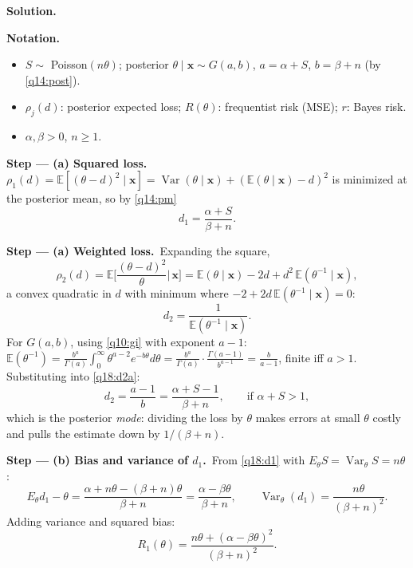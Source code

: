 \documentclass[11pt,a4paper]{article}
\numberwithin{equation}{questao}   %
\newenvironment{notacao}{\par\smallskip\noindent\textbf{Notation.}\begin{itemize}[leftmargin=1.4em,topsep=1pt,itemsep=0pt]\small}{\end{itemize}}
\newcommand{\passo}[2]{\par\smallskip\noindent\textbf{Step --- #1.}~#2}
\newcommand{\solhead}{\par\medskip\noindent{\color{blue!55!black}\rule{\linewidth}{0.3pt}}\par\noindent\textbf{Solution.}}
\newcommand{\E}{\mathbb{E}}
\newcommand{\Var}{\operatorname{Var}}
\newcommand{\1}{\mathbf{1}}
\begin{document}
\begin{sol}
\solhead
\begin{notacao}
\item $S\sim$ Poisson$(n\theta)$; posterior $\theta\mid\mathbf x\sim G(a,b)$, $a=\alpha+S$, $b=\beta+n$ (by \eqref{q14:post}).
\item $\rho_j(d)$: posterior expected loss; $R(\theta)$: frequentist risk (MSE); $r$: Bayes risk.
\item $\alpha,\beta>0$, $n\ge1$.
\end{notacao}

\passo{(a) Squared loss}{$\rho_1(d)=\E[(\theta-d)^2\mid\mathbf x]=\Var(\theta\mid\mathbf x)+(\E(\theta\mid\mathbf x)-d)^2$
is minimized at the posterior mean, so by \eqref{q14:pm}}
\begin{equation}\label{q18:d1}
d_1=\frac{\alpha+S}{\beta+n}.
\end{equation}

\passo{(a) Weighted loss}{Expanding the square,}
\begin{equation}\label{q18:rho2}
\rho_2(d)=\E\Big[\frac{(\theta-d)^2}{\theta}\Big|\,\mathbf x\Big]=\E(\theta\mid\mathbf x)-2d+d^2\,\E(\theta^{-1}\mid\mathbf x),
\end{equation}
a convex quadratic in $d$ with minimum where $-2+2d\,\E(\theta^{-1}\mid\mathbf x)=0$:
\begin{equation}\label{q18:d2a}
d_2=\frac{1}{\E(\theta^{-1}\mid\mathbf x)} .
\end{equation}
For $G(a,b)$, using \eqref{q10:gi} with exponent $a-1$:
$\E(\theta^{-1})=\frac{b^a}{\Gamma(a)}\int_0^\infty\theta^{a-2}e^{-b\theta}d\theta=\frac{b^a}{\Gamma(a)}\cdot\frac{\Gamma(a-1)}{b^{a-1}}=\frac{b}{a-1}$,
finite iff $a>1$. Substituting into \eqref{q18:d2a}:
\begin{equation}\label{q18:d2}
d_2=\frac{a-1}{b}=\frac{\alpha+S-1}{\beta+n},\qquad\text{if }\alpha+S>1,
\end{equation}
which is the posterior \emph{mode}: dividing the loss by $\theta$ makes errors at small $\theta$
costly and pulls the estimate down by $1/(\beta+n)$.

\passo{(b) Bias and variance of $d_1$}{From \eqref{q18:d1} with $E_\theta S=\Var_\theta S=n\theta$:}
\begin{equation}\label{q18:bv}
E_\theta d_1-\theta=\frac{\alpha+n\theta-(\beta+n)\theta}{\beta+n}=\frac{\alpha-\beta\theta}{\beta+n},\qquad
\Var_\theta(d_1)=\frac{n\theta}{(\beta+n)^2}.
\end{equation}
Adding variance and squared bias:
\begin{equation}\label{q18:R1}
R_1(\theta)=\frac{n\theta+(\alpha-\beta\theta)^2}{(\beta+n)^2}.
\end{equation}


\end{sol}
\end{document}
